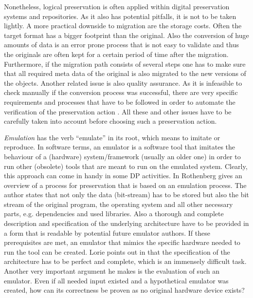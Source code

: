 Nonetheless, logical preservation is often applied within digital preservation systems and repositories. As it also has potential pitfalls, it is not to be taken lightly.
A more practical downside to migration are the storage costs. Often the target format has a bigger footprint than the original. Also the conversion of huge amounts of data is an error prone process that is not easy to validate \cite{Lorie:2001:LTP:379437.379726} and thus the originals are often kept for a certain period of time after the migration. Furthermore, if the migration path consists of several steps one has to make sure that all required meta data of the original is also migrated to the new versions of the objects. Another related issue is also quality assurance. As it is infeasible to check manually if the conversion process was successful, there are very specific requirements and processes that have to be followed in order to automate the verification of the preservation action \cite{feng:2010:qrofm}.
All these and other issues have to be carefully taken into account before choosing such a preservation action.
\newline

\textit{Emulation} has the verb ``emulate'' in its root, which means to imitate or reproduce.
In software terms, an emulator is a software tool that imitates the behaviour of a (hardware) system/framework (usually an older one) in order to run other (obsolete) tools that are meant to run on the emulated system. Clearly, this approach can come in handy in some DP activities.
In \cite{rothenberg:1999:ensuring} Rothenberg gives an overview of a process for preservation that is based on an emulation process. The author states that not only the data (bit-stream) has to be stored but also the bit stream of the original program, the operating system and all other necessary parts, e.g. dependencies and used libraries. Also a thorough and complete description and specification of the underlying architecture have to be provided in a form that is readable by potential future emulator authors. If these prerequisites are met, an emulator that mimics the specific hardware needed to run the tool can be created.
Lorie points out in \cite{Lorie:2001:LTP:379437.379726} that the specification of the architecture has to be perfect and complete, which is an immensely difficult task. Another very important argument he makes is the evaluation of such an emulator. Even if all needed input existed and a hypothetical emulator was created, how can its correctness be proven as no original hardware device exists?


